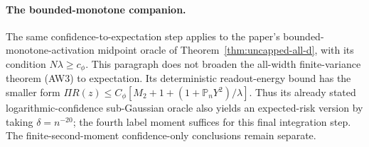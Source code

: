 \paragraph{The bounded-monotone companion.}
The same confidence-to-expectation step applies to the paper's
bounded-monotone-activation midpoint oracle of
Theorem~\ref{thm:uncapped-all-d}, with its condition $N\lambda\ge c_\phi$.
This paragraph does not broaden the all-width finite-variance theorem
(AW3) to expectation. Its deterministic
readout-energy bound has the smaller form
$\Pi R(z)\le C_\phi[M_2+1+(1+\mathbb P_nY^2)/\lambda]$.
Thus its already stated logarithmic-confidence sub-Gaussian oracle
also yields an expected-risk version by taking $\delta=n^{-20}$;
the fourth label moment suffices for this final integration step.
The finite-second-moment confidence-only conclusions remain separate.
